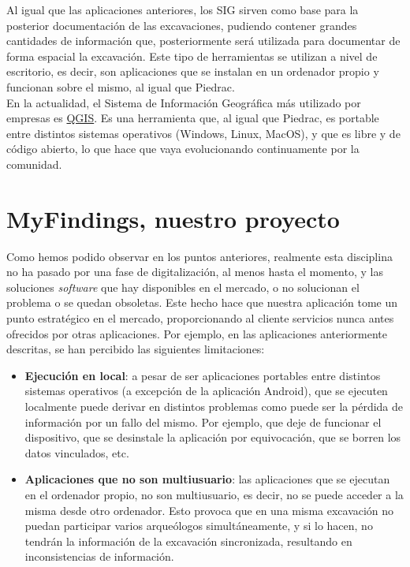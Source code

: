 Al igual que las aplicaciones anteriores, los SIG sirven como base para la posterior
documentación de las excavaciones, pudiendo contener grandes cantidades de información
que, posteriormente será utilizada para documentar de forma espacial la excavación. Este
tipo de herramientas se utilizan a nivel de escritorio, es decir, son aplicaciones que
se instalan en un ordenador propio y funcionan sobre el mismo, al igual que Piedrac.\\

En la actualidad, el Sistema de Información Geográfica más utilizado por empresas es
\href{https://www.qgis.org/es/site/}{QGIS}. Es una herramienta que, al igual que Piedrac,
es portable entre distintos sistemas operativos (Windows, Linux, MacOS), y que es libre
y de código abierto, lo que hace que vaya evolucionando continuamente por la comunidad.

\section{MyFindings, nuestro proyecto}
Como hemos podido observar en los puntos anteriores, realmente esta disciplina no ha pasado
por una fase de digitalización, al menos hasta el momento, y las soluciones \textit{software}
que hay disponibles en el mercado, o no solucionan el problema o se quedan obsoletas. Este
hecho hace que nuestra aplicación tome un punto estratégico en el mercado, proporcionando al
cliente servicios nunca antes ofrecidos por otras aplicaciones. Por ejemplo, en las
aplicaciones anteriormente descritas, se han percibido las siguientes limitaciones:

    \begin{itemize}
        \item \textbf{Ejecución en local}: a pesar de ser aplicaciones portables entre
        distintos sistemas operativos (a excepción de la aplicación Android), que se
        ejecuten localmente puede derivar en distintos problemas como puede ser la pérdida
        de información por un fallo del mismo. Por ejemplo, que deje de funcionar el
        dispositivo, que se desinstale la aplicación por equivocación, que se borren los
        datos vinculados, etc.
        
        \item \textbf{Aplicaciones que no son multiusuario}: las aplicaciones que se
        ejecutan en el ordenador propio, no son multiusuario, es decir, no se puede
        acceder a la misma desde otro ordenador. Esto provoca que en una misma excavación
        no puedan participar varios arqueólogos simultáneamente, y si lo hacen, no tendrán
        la información de la excavación sincronizada, resultando en inconsistencias de
        información.
    \end{itemize}


